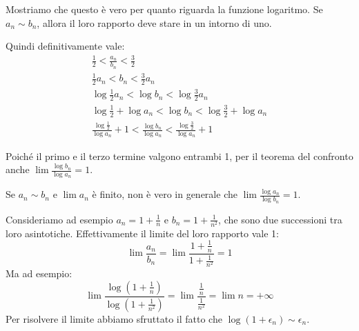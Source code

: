 Mostriamo che questo è vero per quanto riguarda la funzione logaritmo. Se $a_n \sim b_n$, allora il loro rapporto deve stare in un intorno di uno.

Quindi definitivamente vale:
\begin{gather*}
\frac{1}{2} < \frac{a_n}{b_n} < \frac{3}{2} \\
\frac{1}{2}a_n < b_n < \frac{3}{2}a_n \\
\log \frac{1}{2}a_n < \log b_n < \log \frac{3}{2}a_n \\
\log \frac{1}{2} + \log a_n < \log b_n < \log \frac{3}{2} + \log a_n \\
\frac{\log \frac{1}{2}}{\log a_n} + 1 < \frac{\log b_n}{\log a_n} < \frac{\log \frac{3}{2}}{\log a_n} + 1
\end{gather*}

Poiché il primo e il terzo termine valgono entrambi 1, per il teorema del confronto anche $\lim \frac{\log b_n}{\log a_n} = 1$.

\begin{remark}
Se $a_n \sim b_n$ e $\lim a_n$ è finito, non è vero in generale che $\lim \frac{\log a_n}{\log b_n} = 1$.
\end{remark}

\begin{example}
Consideriamo ad esempio $a_n = 1 + \frac{1}{n}$ e $b_n = 1 + \frac{1}{n^2}$, che sono due successioni tra loro asintotiche. Effettivamente il limite del loro rapporto vale 1:
\begin{equation*}
\lim \frac{a_n}{b_n} = \lim \frac{1 + \frac{1}{n}}{1 + \frac{1}{n^2}} = 1
\end{equation*}
Ma ad esempio:
\begin{equation*}
\lim \frac{\log (1 + \frac{1}{n})}{\log (1 + \frac{1}{n^2})} = \lim \frac{\frac{1}{n}}{\frac{1}{n^2}} = \lim n = +\infty
\end{equation*}
Per risolvere il limite abbiamo sfruttato il fatto che $\log(1+\epsilon_n) \sim \epsilon_n$.
\end{example}
